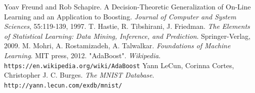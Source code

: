 \documentclass[12pt]{article}
\begin{document}
%
%
%




\begin{thebibliography}{99}
 Yoav Freund and Rob Schapire. A Decision-Theoretic Generalization of On-Line Learning
and an Application to Boosting. {\it Journal of Computer and System Sciences}, 55:119-139, 1997.
 T. Hastie, R. Tibshirani, J. Friedman. {\it The Elements of Statistical Learning: Data Mining, Inference, and Prediction}. Springer-Verlag, 2009.
 M. Mohri, A. Rostamizadeh, A. Talwalkar. {\it Foundations of Machine Learning}. MIT press, 2012.
 "AdaBoost". {\it Wikipedia}. {\tt https://en.wikipedia.org/wiki/AdaBoost}
 Yann LeCun, Corinna Cortes, Christopher J. C. Burges. {\it The MNIST Database}. {\tt http://yann.lecun.com/exdb/mnist/}
\end{thebibliography}
\end{document}
